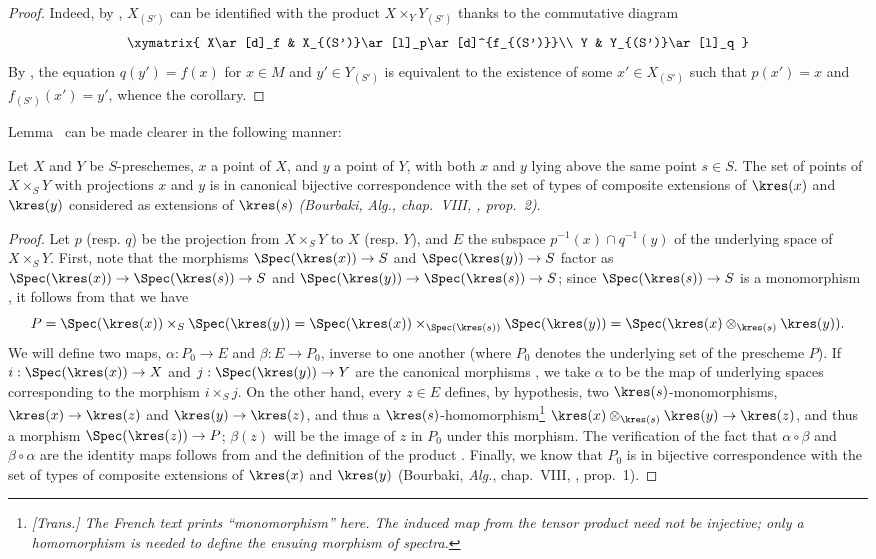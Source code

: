 \begin{proof}
Indeed, by , $X_{(S')}$ can be identified with the product $X\times_Y Y_{(S')}$ thanks to the commutative diagram
\[
  \xymatrix{
    X\ar[d]_f &
    X_{(S')}\ar[l]_p\ar[d]^{f_{(S')}}\\
    Y &
    Y_{(S')}\ar[l]_q
  }
\]
By , the equation $q(y')=f(x)$ for $x\in M$ and $y'\in Y_{(S')}$ is equivalent to the existence of some $x'\in X_{(S')}$ such that $p(x')=x$ and $f_{(S')}(x')=y'$, whence the corollary.
\end{proof}

Lemma~ can be made clearer in the following manner:
\begin{proposition}[3.4.9]
\label{I.3.4.9}
Let $X$ and $Y$ be $S$-preschemes, $x$ a point of $X$, and $y$ a point of $Y$, with both $x$ and $y$ lying above the same point $s\in S$.
The set of points of $X\times_S Y$ with projections $x$ and $y$ is in canonical bijective correspondence with the set of types of composite extensions of $\kres(x)$ and $\kres(y)$ considered as extensions of $\kres(s)$ \emph{(Bourbaki, \emph{Alg.}, chap.~VIII, , prop.~2)}.
\end{proposition}

\begin{proof}
Let $p$ (resp. $q$) be the projection from $X\times_S Y$ to $X$ (resp. $Y$), and $E$ the subspace $p^{-1}(x)\cap q^{-1}(y)$ of the underlying space of $X\times_S Y$.
First, note that the morphisms $\Spec(\kres(x))\to S$ and $\Spec(\kres(y))\to S$ factor as $\Spec(\kres(x))\to\Spec(\kres(s))\to S$ and $\Spec(\kres(y))\to\Spec(\kres(s))\to S$; since $\Spec(\kres(s))\to S$ is a monomorphism , it follows from  that we have
\[
  P=\Spec(\kres(x))\times_S\Spec(\kres(y))=\Spec(\kres(x))\times_{\Spec(\kres(s))}\Spec(\kres(y))=\Spec(\kres(x)\otimes_{\kres(s)}\kres(y)).
\]
We will define two maps, $\alpha:P_0\to E$ and $\beta:E\to P_0$, inverse to one another (where $P_0$ denotes the underlying set of the prescheme $P$).
If $i:\Spec(\kres(x))\to X$ and $j:\Spec(\kres(y))\to Y$ are the canonical morphisms , we take $\alpha$ to be the map of underlying spaces corresponding to the morphism $i\times_S j$.
On the other hand, every $z\in E$ defines, by hypothesis, two $\kres(s)$-monomorphisms, $\kres(x)\to\kres(z)$ and $\kres(y)\to\kres(z)$, and thus a $\kres(s)$-homomorphism\footnote{\emph{[Trans.] The French text prints ``monomorphism'' here. The induced map from the tensor product need not be injective; only a homomorphism is needed to define the ensuing morphism of spectra.}} $\kres(x)\otimes_{\kres(s)}\kres(y)\to\kres(z)$, and thus a morphism $\Spec(\kres(z))\to P$; $\beta(z)$ will be the image of $z$ in $P_0$ under this morphism.
The verification of the fact that $\alpha\circ\beta$ and $\beta\circ\alpha$ are the identity maps follows from  and the definition of the product .
Finally, we know that $P_0$ is in bijective correspondence with the set of types of composite extensions of $\kres(x)$ and $\kres(y)$ (Bourbaki, \emph{Alg.}, chap.~VIII, , prop.~1).
\end{proof}

